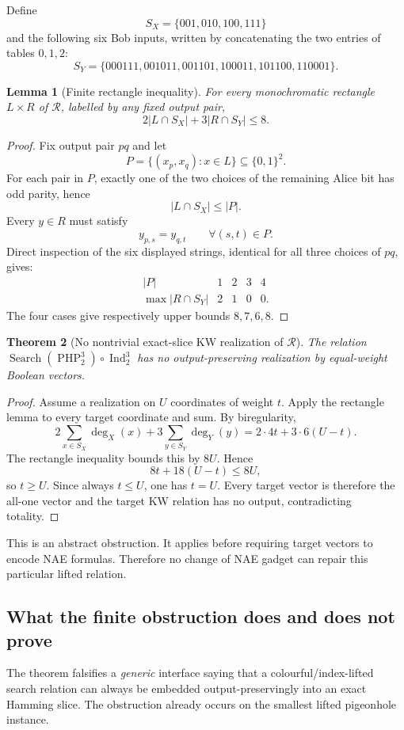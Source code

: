 \documentclass[11pt]{article}
\newtheorem{theorem}{Theorem}
\newtheorem{lemma}[theorem]{Lemma}
\begin{document}
Define
\[
S_X=\{001,010,100,111\}
\]
and the following six Bob inputs, written by concatenating the two entries of tables $0,1,2$:
\[
S_Y=\{000111,001011,001101,100011,101100,110001\}.
\]

\begin{lemma}[Finite rectangle inequality]
For every monochromatic rectangle $L\times R$ of $\mathcal R$, labelled by any fixed output pair,
\[
\boxed{2|L\cap S_X|+3|R\cap S_Y|\le8.}
\]
\end{lemma}
\begin{proof}
Fix output pair $pq$ and let
\[
P=\{(x_p,x_q):x\in L\}\subseteq\{0,1\}^2.
\]
For each pair in $P$, exactly one of the two choices of the remaining Alice bit has odd parity, hence
\[
|L\cap S_X|\le|P|.
\]
Every $y\in R$ must satisfy
\[
y_{p,s}=y_{q,t}\qquad\forall(s,t)\in P.
\]
Direct inspection of the six displayed strings, identical for all three choices of $pq$, gives:
\[
\begin{array}{c|cccc}
|P|&1&2&3&4\\ \hline
\max |R\cap S_Y|&2&1&0&0.
\end{array}
\]
The four cases give respectively upper bounds $8,7,6,8$.
\end{proof}

\begin{theorem}[No nontrivial exact-slice KW realization of $\mathcal R$]
The relation $\operatorname{Search}(\operatorname{PHP}_2^3)\circ\operatorname{Ind}_2^3$ has no output-preserving realization by equal-weight Boolean vectors.
\end{theorem}
\begin{proof}
Assume a realization on $U$ coordinates of weight $t$. Apply the rectangle lemma to every target coordinate and sum. By biregularity,
\[
2\sum_{x\in S_X}\deg_X(x)+3\sum_{y\in S_Y}\deg_Y(y)
=
2\cdot4t+3\cdot6(U-t).
\]
The rectangle inequality bounds this by $8U$. Hence
\[
8t+18(U-t)\le8U,
\]
so $t\ge U$. Since always $t\le U$, one has $t=U$. Every target vector is therefore the all-one vector and the target KW relation has no output, contradicting totality.
\end{proof}

This is an abstract obstruction. It applies before requiring target vectors to encode NAE formulas. Therefore no change of NAE gadget can repair this particular lifted relation.

\subsection{What the finite obstruction does and does not prove}
The theorem falsifies a \emph{generic} interface saying that a colourful/index-lifted search relation can always be embedded output-preservingly into an exact Hamming slice. The obstruction already occurs on the smallest lifted pigeonhole instance.
\end{document}
